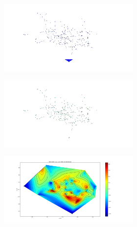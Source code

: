 \begin{figure}
  \centering
  \begin{subfigure}{0.48\textwidth}
    \begin{subfigure}{\textwidth}
      \includegraphics[clip, trim = 70 0 190 0, width=\textwidth]{figures/chapter3/contour_x}
    \end{subfigure}
    \begin{subfigure}{\textwidth}
      \includegraphics[clip, trim = 70 0 190 0, width=\textwidth]{figures/chapter3/contour_y}
    \end{subfigure}
    \begin{subfigure}{\textwidth}
      \includegraphics[clip, trim = 70 0 190 0, width=\textwidth]{figures/chapter3/contour_z}

\end{subfigure}
\end{subfigure}
\end{figure}
